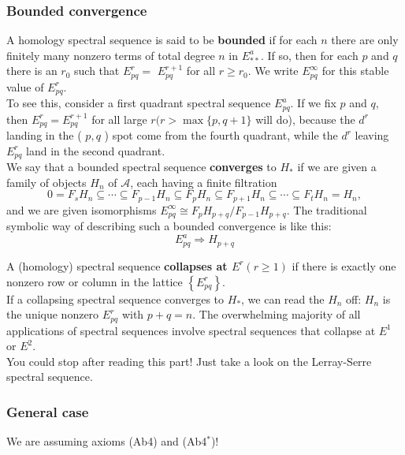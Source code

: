 \subsubsection{Bounded convergence}

A homology spectral sequence is said to be \textbf{bounded} if for each $n$ there are only finitely many nonzero terms of total degree $n$ in $E_{* *}^a$. If so, then for each $p$ and $q$ there is an $r_0$ such that $E_{p q}^r=$ $E_{p q}^{r+1}$ for all $r \geq r_0$. We write $E_{p q}^{\infty}$ for this stable value of $E_{p q}^r$.\\
To see this, consider a first quadrant spectral sequence $E^a _{pq}$. If we fix $p$ and $q$, then $E_{p q}^r=E_{p q}^{r+1}$ for all large $r(r>\max \{p, q+1\}$ will do), because the $d^r$ landing in the ( $p, q$ ) spot come from the fourth quadrant, while the $d^r$ leaving $E_{p q}^r$ land in the second quadrant.\\ 

We say that a bounded spectral sequence \textbf{converges} to $H_*$ if we are given a family of objects $H_n$ of $\mathcal{A}$, each having a finite filtration
$$
0=F_s H_n \subseteq \cdots \subseteq F_{p-1} H_n \subseteq F_p H_n \subseteq F_{p+1} H_n \subseteq \cdots \subseteq F_t H_n=H_n,
$$
and we are given isomorphisms $E_{p q}^{\infty} \cong F_p H_{p+q} / F_{p-1} H_{p+q}$. The traditional symbolic way of describing such a bounded convergence is like this:
$$
E_{p q}^a \Rightarrow H_{p+q}
$$

A (homology) spectral sequence \textbf{collapses at $E^r(r \geq 1)$ } if there is exactly one nonzero row or column in the lattice $\left\{E_{p q}^r\right\}$.\\
If a collapsing spectral sequence converges to $H_*$, we can read the $H_n$ off: $H_n$ is the unique nonzero $E_{p q}^r$ with $p+q=n$. The overwhelming majority of all applications of spectral sequences involve spectral sequences that collapse at $E^1$ or $E^2$.\\

You could stop after reading this part! Just take a look on the Lerray-Serre spectral sequence.\\


\subsubsection{General case}

We are assuming axioms (Ab4) and (Ab4$^*$)!\\

